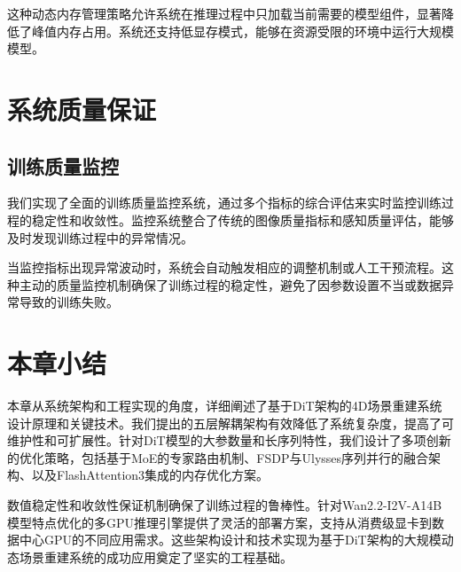 这种动态内存管理策略允许系统在推理过程中只加载当前需要的模型组件，显著降低了峰值内存占用。系统还支持低显存模式，能够在资源受限的环境中运行大规模模型。

\section{系统质量保证}

\subsection{训练质量监控}

我们实现了全面的训练质量监控系统，通过多个指标的综合评估来实时监控训练过程的稳定性和收敛性。监控系统整合了传统的图像质量指标和感知质量评估，能够及时发现训练过程中的异常情况。

当监控指标出现异常波动时，系统会自动触发相应的调整机制或人工干预流程。这种主动的质量监控机制确保了训练过程的稳定性，避免了因参数设置不当或数据异常导致的训练失败。

\section{本章小结}

本章从系统架构和工程实现的角度，详细阐述了基于DiT架构的4D场景重建系统设计原理和关键技术。我们提出的五层解耦架构有效降低了系统复杂度，提高了可维护性和可扩展性。针对DiT模型的大参数量和长序列特性，我们设计了多项创新的优化策略，包括基于MoE的专家路由机制、FSDP与Ulysses序列并行的融合架构、以及FlashAttention3集成的内存优化方案。

数值稳定性和收敛性保证机制确保了训练过程的鲁棒性。针对Wan2.2-I2V-A14B模型特点优化的多GPU推理引擎提供了灵活的部署方案，支持从消费级显卡到数据中心GPU的不同应用需求。这些架构设计和技术实现为基于DiT架构的大规模动态场景重建系统的成功应用奠定了坚实的工程基础。
